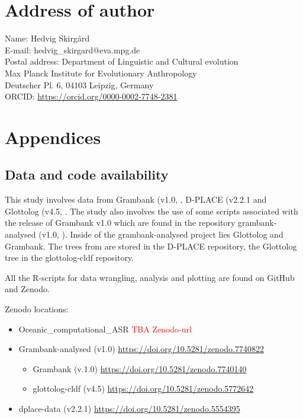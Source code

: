 \documentclass[12pt,letterpaper]{article}
\begin{document}
\newpage
\section*{Address of author}
Name: Hedvig Skirgård\\
E-mail: hedvig\_{}skirgard@eva.mpg.de\\
Postal address: Department of Linguistic and Cultural evolution\\
Max Planck Institute for Evolutionary Anthropology\\
Deutscher Pl. 6, 04103 Leipzig, Germany\\
ORCID: \url{https://orcid.org/0000-0002-7748-2381}

\newpage

\appendix
\section*{Appendices}
\renewcommand{\thesubsection}{\Alph{subsection}}

\subsection{Data and code availability}
\label{supp_data_availability}
This study involves data from Grambank (v1.0, \cite{grambank_dataset_zenodo_v1, grambank_release}, D-PLACE (v2.2.1 \citet{d_place_all} and Glottolog (v4.5, \citet{glottolog4_5}. The study also involves the use of some scripts associated with the release of Grambank v1.0 which are found in the repository grambank-analysed (v1.0, \citet{grambank_analysed_1_0}). Inside of the grambank-analysed project lies Glottolog and Grambank. The trees from \citet{grayetal_2009} are stored in the D-PLACE repository, the Glottolog tree in the glottolog-cldf repository.

All the R-scripts for data wrangling, analysis and plotting are found on GitHub and Zenodo.

Zenodo locations:

\begin{itemize}
\item Oceanic\_computational\_ASR  \textcolor{red}{TBA Zenodo-url}
\item Grambank-analysed (v1.0) \url{https://doi.org/10.5281/zenodo.7740822}
\begin{itemize}
\item Grambank (v.1.0) \url{https://doi.org/10.5281/zenodo.7740140}
\item glottolog-cldf (v4.5) \url{https://doi.org/10.5281/zenodo.5772642}
\end{itemize}
\item dplace-data (v2.2.1) \url{https://doi.org/10.5281/zenodo.5554395}
\end{itemize}
\end{document}
